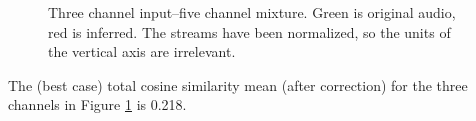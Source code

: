 \documentclass[11pt]{report}
\begin{document}
\begin{figure}[H]
  \centering
  \hfil
  \caption{Three channel input--five channel mixture. Green is original audio, red is inferred. The streams have been normalized, so the units of the vertical axis are irrelevant.}
  \label{fig:b}
\end{figure}
The (best case) total cosine similarity mean (after correction) for the three channels in Figure \ref{fig:b} is 0.218.
\end{document}
